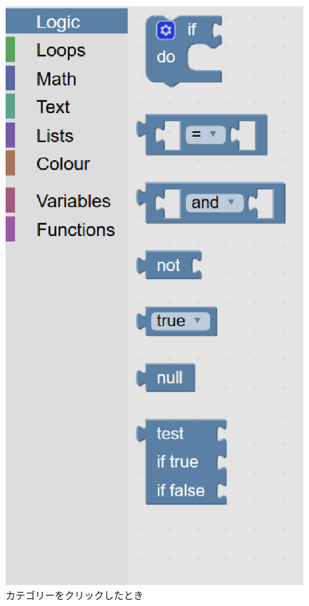 \documentclass{risepaper}
\begin{document}
\begin{figure}[h]
\begin{center}
\includegraphics[scale=0.3]{img/blockmenu_open.eps}
\caption{カテゴリーをクリックしたとき}%
\label{fig:blockmenu_open}
\end{center}%
\end{figure}%
\end{document}
